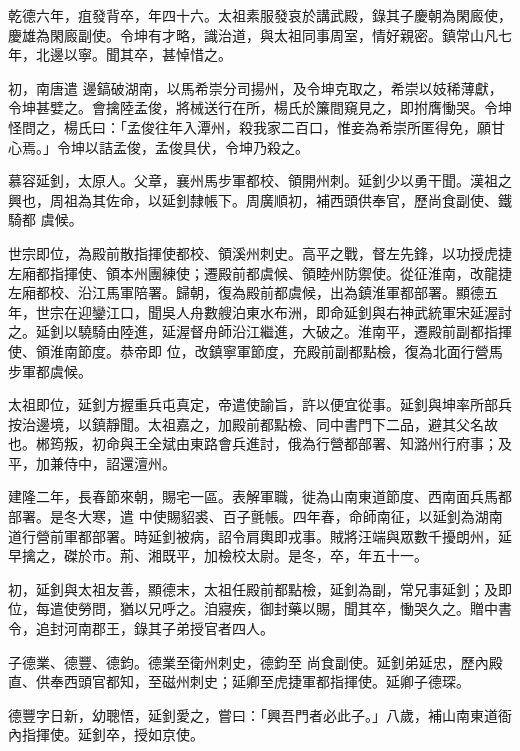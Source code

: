 \begin{pinyinscope}
 乾德六年，疽發背卒，年四十六。太祖素服發哀於講武殿，錄其子慶朝為閑廄使，慶雄為閑廄副使。令坤有才略，識治道，與太祖同事周室，情好親密。鎮常山凡七年，北邊以寧。聞其卒，甚悼惜之。



 初，南唐遣
 邊鎬破湖南，以馬希崇分司揚州，及令坤克取之，希崇以妓稀薄獻，令坤甚嬖之。會擒陸孟俊，將械送行在所，楊氏於簾間窺見之，即拊膺慟哭。令坤怪問之，楊氏曰：「孟俊往年入潭州，殺我家二百口，惟妾為希崇所匿得免，願甘心焉。」令坤以詰孟俊，孟俊具伏，令坤乃殺之。



 慕容延釗，太原人。父章，襄州馬步軍都校、領開州刺。延釗少以勇干聞。漢祖之興也，周祖為其佐命，以延釗隸帳下。周廣順初，補西頭供奉官，歷尚食副使、鐵騎都
 虞候。



 世宗即位，為殿前散指揮使都校、領溪州刺史。高平之戰，督左先鋒，以功授虎捷左廂都指揮使、領本州團練使；遷殿前都虞候、領睦州防禦使。從征淮南，改龍捷左廂都校、沿江馬軍陪署。歸朝，復為殿前都虞候，出為鎮淮軍都部署。顯德五年，世宗在迎鑾江口，聞吳人舟數艘泊東水布洲，即命延釗與右神武統軍宋延渥討之。延釗以驍騎由陸進，延渥督舟師沿江繼進，大破之。淮南平，遷殿前副都指揮使、領淮南節度。恭帝即
 位，改鎮寧軍節度，充殿前副都點檢，復為北面行營馬步軍都虞候。



 太祖即位，延釗方握重兵屯真定，帝遣使諭旨，許以便宜從事。延釗與坤率所部兵按治邊境，以鎮靜聞。太祖嘉之，加殿前都點檢、同中書門下二品，避其父名故也。郴筠叛，初命與王全斌由東路會兵進討，俄為行營都部署、知潞州行府事；及平，加兼侍中，詔還澶州。



 建隆二年，長春節來朝，賜宅一區。表解軍職，徙為山南東道節度、西南面兵馬都部署。是冬大寒，遣
 中使賜貂裘、百子氈帳。四年春，命師南征，以延釗為湖南道行營前軍都部署。時延釗被病，詔令肩輿即戎事。賊將汪端與眾數千擾朗州，延早擒之，磔於市。荊、湘既平，加檢校太尉。是冬，卒，年五十一。



 初，延釗與太祖友善，顯德末，太祖任殿前都點檢，延釗為副，常兄事延釗；及即位，每遣使勞問，猶以兄呼之。洎寢疾，御封藥以賜，聞其卒，慟哭久之。贈中書令，追封河南郡王，錄其子弟授官者四人。



 子德業、德豐、德鈞。德業至衛州刺史，德鈞至
 尚食副使。延釗弟延忠，歷內殿直、供奉西頭官都知，至磁州刺史；延卿至虎捷軍都指揮使。延卿子德琛。



 德豐字日新，幼聰悟，延釗愛之，嘗曰：「興吾門者必此子。」八歲，補山南東道衙內指揮使。延釗卒，授如京使。




\end{pinyinscope}
